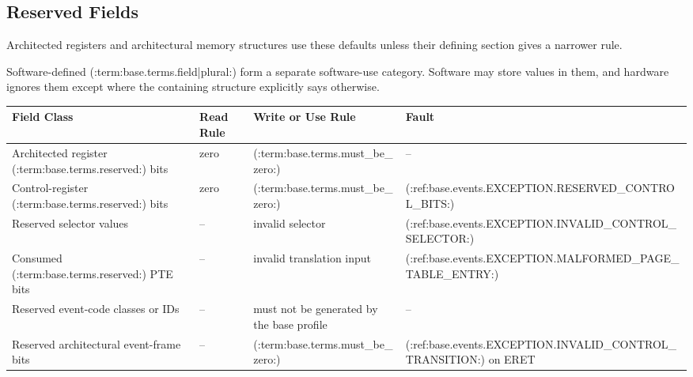 \subsection{Reserved Fields}
Architected registers and architectural memory structures use these defaults unless their defining section gives a
narrower rule.

Software-defined (:term:base.terms.field|plural:) form a separate software-use category. Software may store values in them, and hardware
ignores them except where the containing structure explicitly says otherwise.

\Needspace{1.25in}
\begingroup\footnotesize
\setlength{\aboverulesep}{0pt}
\setlength{\belowrulesep}{0pt}
\setlength{\extrarowheight}{1.2pt}
\begin{center}
\begin{tabularx}{\linewidth}{@{}>{\raggedright\arraybackslash}p{1.65in}>{\raggedright\arraybackslash}p{0.75in}>{\raggedright\arraybackslash}p{1.35in}>{\raggedright\arraybackslash}X@{}}
\toprule
\rowcolor{BedrockHeaderFill}
\textbf{Field Class} & \textbf{Read Rule} & \textbf{Write or Use Rule} & \textbf{Fault}\\
\midrule
Architected register (:term:base.terms.reserved:) bits & zero & (:term:base.terms.must_be_zero:) & --\\
Control-register (:term:base.terms.reserved:) bits & zero & (:term:base.terms.must_be_zero:) & (:ref:base.events.EXCEPTION.RESERVED_CONTROL_BITS:)\\
Reserved selector values & -- & invalid selector & (:ref:base.events.EXCEPTION.INVALID_CONTROL_SELECTOR:)\\
Consumed (:term:base.terms.reserved:) PTE bits & -- & invalid translation input & (:ref:base.events.EXCEPTION.MALFORMED_PAGE_TABLE_ENTRY:)\\
Reserved event-code classes or IDs & -- & must not be generated by the base profile & --\\
Reserved architectural event-frame bits & -- & (:term:base.terms.must_be_zero:) & (:ref:base.events.EXCEPTION.INVALID_CONTROL_TRANSITION:) on ERET\\
\bottomrule
\end{tabularx}
\end{center}
\endgroup
